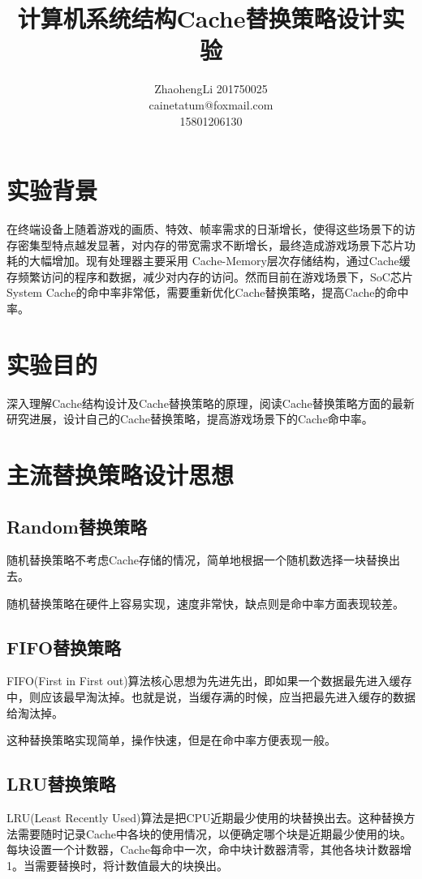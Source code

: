 \documentclass{article}
\title{计算机系统结构Cache替换策略设计实验}
\author{ZhaohengLi 201750025\\cainetatum@foxmail.com\\15801206130}
\begin{document}
\maketitle

\section{实验背景}
在终端设备上随着游戏的画质、特效、帧率需求的日渐增长，使得这些场景下的访存密集型特点越发显著，对内存的带宽需求不断增长，最终造成游戏场景下芯片功耗的大幅增加。现有处理器主要采用 Cache-Memory层次存储结构，通过Cache缓存频繁访问的程序和数据，减少对内存的访问。然而目前在游戏场景下，SoC芯片System Cache的命中率非常低，需要重新优化Cache替换策略，提高Cache的命中率。

\section{实验目的}
深入理解Cache结构设计及Cache替换策略的原理，阅读Cache替换策略方面的最新研究进展，设计自己的Cache替换策略，提高游戏场景下的Cache命中率。

\section{主流替换策略设计思想}

\subsection{Random替换策略}
随机替换策略不考虑Cache存储的情况，简单地根据一个随机数选择一块替换出去。

随机替换策略在硬件上容易实现，速度非常快，缺点则是命中率方面表现较差。

\subsection{FIFO替换策略}
FIFO(First in First out)算法核心思想为先进先出，即如果一个数据最先进入缓存中，则应该最早淘汰掉。也就是说，当缓存满的时候，应当把最先进入缓存的数据给淘汰掉。

这种替换策略实现简单，操作快速，但是在命中率方便表现一般。

\subsection{LRU替换策略}
LRU(Least Recently Used)算法是把CPU近期最少使用的块替换出去。这种替换方法需要随时记录Cache中各块的使用情况，以便确定哪个块是近期最少使用的块。每块设置一个计数器，Cache每命中一次，命中块计数器清零，其他各块计数器增1。当需要替换时，将计数值最大的块换出。
\end{document}

